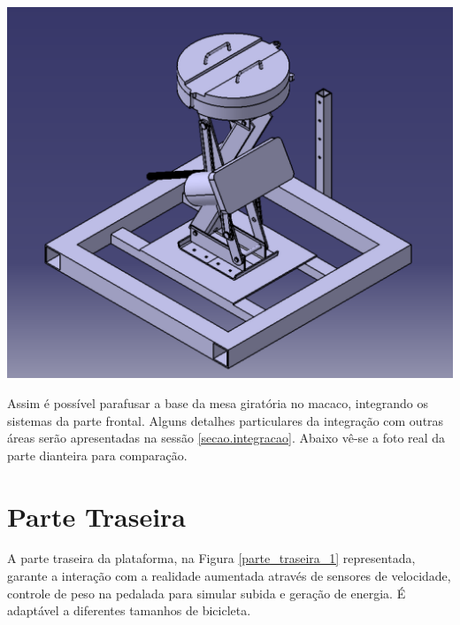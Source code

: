             \begin{center}
        \includegraphics[scale=0.5]{figuras/Base_dianteira_macaco_mesagiratoria}
        \label{Base_dianteira_macaco_ mesagiratoria}
    \end{center}  

    Assim é possível parafusar a base da mesa giratória no macaco, integrando os sistemas da parte frontal. Alguns detalhes particulares da integração com outras áreas serão apresentadas na sessão \ref{secao.integracao}. Abaixo vê-se a foto real da parte dianteira para comparação.
    

\section{Parte Traseira}
    A parte traseira da plataforma, na Figura \ref{parte_traseira_1} representada, garante a interação com a realidade aumentada através de sensores de velocidade, controle de peso na pedalada para simular subida e geração de energia. É adaptável a diferentes tamanhos de bicicleta.
 
